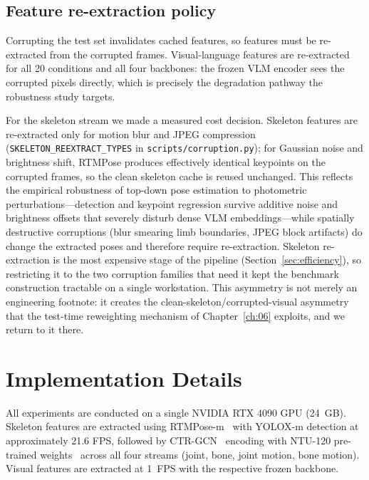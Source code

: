 \subsection{Feature re-extraction policy}
\label{sec:reextraction}

Corrupting the test set invalidates cached features, so features must be
re-extracted from the corrupted frames. Visual-language features are
re-extracted for all 20 conditions and all four backbones: the frozen VLM
encoder sees the corrupted pixels directly, which is precisely the
degradation pathway the robustness study targets.

For the skeleton stream we made a measured cost decision. Skeleton features
are re-extracted only for motion blur and JPEG compression
(\texttt{SKELETON\_REEXTRACT\_TYPES} in \texttt{scripts/corruption.py}); for
Gaussian noise and brightness shift, RTMPose produces effectively identical
keypoints on the corrupted frames, so the clean skeleton cache is reused
unchanged. This reflects the empirical robustness of top-down pose estimation
to photometric perturbations---detection and keypoint regression survive
additive noise and brightness offsets that severely disturb dense VLM
embeddings---while spatially destructive corruptions (blur smearing limb
boundaries, JPEG block artifacts) do change the extracted poses and therefore
require re-extraction. Skeleton re-extraction is the most expensive stage of
the pipeline (Section~\ref{sec:efficiency}), so restricting it to the two
corruption families that need it kept the benchmark construction tractable on
a single workstation. This asymmetry is not merely an engineering footnote: it
creates the clean-skeleton/corrupted-visual asymmetry that the test-time
reweighting mechanism of Chapter~\ref{ch:06} exploits, and we return to it
there.

\section{Implementation Details}
\label{sec:impl}

All experiments are conducted on a single NVIDIA RTX 4090 GPU (24~GB).
Skeleton features are extracted using RTMPose-m~\cite{jiang2023rtmpose} with
YOLOX-m detection at approximately 21.6 FPS, followed by
CTR-GCN~\cite{chen2021ctrgcn} encoding with NTU-120 pre-trained
weights~\cite{yan2022pyskl} across all four streams (joint, bone, joint
motion, bone motion). Visual features are extracted at 1~FPS with the
respective frozen backbone.

